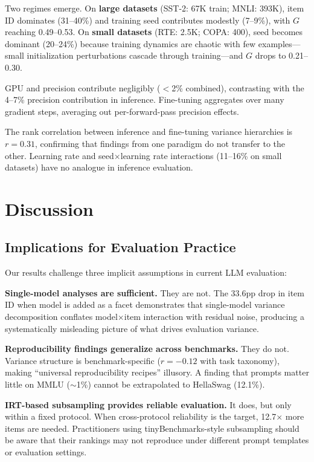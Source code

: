 \documentclass[11pt,twocolumn]{article}
\newcommand{\Gcoeff}{\ensuremath{G}}
\newcommand{\pct}{\%}
\begin{document}
Two regimes emerge. On \textbf{large datasets} (SST-2: 67K train; MNLI: 393K), item ID dominates (31--40\pct{}) and training seed contributes modestly (7--9\pct{}), with $\Gcoeff$ reaching 0.49--0.53. On \textbf{small datasets} (RTE: 2.5K; COPA: 400), seed becomes dominant (20--24\pct{}) because training dynamics are chaotic with few examples---small initialization perturbations cascade through training---and $\Gcoeff$ drops to 0.21--0.30.

GPU and precision contribute negligibly ($<$2\pct{} combined), contrasting with the 4--7\pct{} precision contribution in inference. Fine-tuning aggregates over many gradient steps, averaging out per-forward-pass precision effects.

The rank correlation between inference and fine-tuning variance hierarchies is $r=0.31$, confirming that findings from one paradigm do not transfer to the other. Learning rate and seed$\times$learning rate interactions (11--16\pct{} on small datasets) have no analogue in inference evaluation.

\section{Discussion}

\subsection{Implications for Evaluation Practice}

Our results challenge three implicit assumptions in current LLM evaluation:

\textbf{Single-model analyses are sufficient.} They are not. The 33.6pp drop in item ID when model is added as a facet demonstrates that single-model variance decomposition conflates model$\times$item interaction with residual noise, producing a systematically misleading picture of what drives evaluation variance.

\textbf{Reproducibility findings generalize across benchmarks.} They do not. Variance structure is benchmark-specific ($r=-0.12$ with task taxonomy), making ``universal reproducibility recipes'' illusory. A finding that prompts matter little on MMLU ($\sim$1\pct{}) cannot be extrapolated to HellaSwag (12.1\pct{}).

\textbf{IRT-based subsampling provides reliable evaluation.} It does, but only within a fixed protocol. When cross-protocol reliability is the target, 12.7$\times$ more items are needed. Practitioners using tinyBenchmarks-style subsampling should be aware that their rankings may not reproduce under different prompt templates or evaluation settings.
\end{document}
